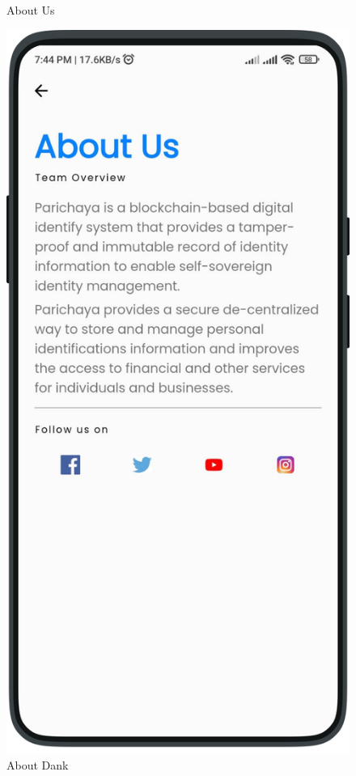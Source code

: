 \begin{multicols}{3}
\begin{figure}[H]
            \caption[About Us]{About Us}
            \label{fig:AboutUs.png}
            \end{figure}     
            \begin{figure}[H]
            \centering
            \includegraphics[width=0.85\linewidth]{images/results/mobile/TeamOverview.png}
            \caption[About Dank]{About Dank}
            \label{fig:TeamOverview.png}
            \end{figure}
            \begin{figure}[H]

\end{figure}
\end{multicols}
